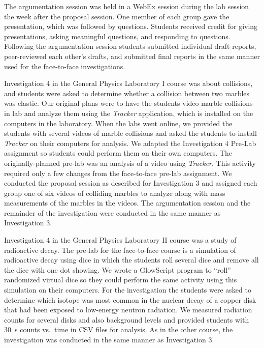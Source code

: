 \documentclass[aip, numerical, preprint]{revtex4-2}
\begin{document}
The argumentation session was held in a WebEx session during the lab session the week
after the proposal session. One member of each group gave the presentation, which was followed
by questions. Students received credit for giving presentations, asking meaningful questions,
and responding to questions.  Following the argumentation session students submitted individual
draft reports, peer-reviewed each other's drafts, and submitted final reports in the same
manner used for the face-to-face investigations.

Investigation 4 in the General Physics Laboratory I course was about collisions, and students
were asked to determine whether a collision between two marbles was elastic. Our original plans
were to have the students video marble collisions in lab and analyze them using the
\emph{Tracker} application\citep{bro2009}, which is installed on the computers in the
laboratory. When the labs went online, we provided the students with several videos of marble
collisions and asked the students to install \emph{Tracker} on their computers for analysis.
We adapted the Investigation 4 Pre-Lab assignment so students could perform them on their own
computers. The originally-planned pre-lab was an analysis of a video using \emph{Tracker}. This
activity required only a few changes from the face-to-face pre-lab assignment. We conducted the
proposal session as described for Investigation 3 and assigned each group one of six videos of
colliding marbles to analyze along with mass measurements of the marbles in the videos. The
argumentation session and the remainder of the investigation were conducted in the same manner
as Investigation 3.

Investigation 4 in the General Physics Laboratory II course was a study of radioactive
decay. The pre-lab for the face-to-face course is a simulation of radioactive decay using dice
in which the students roll several dice and remove all the dice with one dot showing. We wrote
a GlowScript\citep{glowscript} program to ``roll'' randomized virtual dice so they could
perform the same activity using this simulation on their computers. For the investigation the
students were asked to determine which isotope was most common in the nuclear decay of a copper
disk that had been exposed to low-energy neutron radiation. We measured radiation counts for
several disks and also background levels and provided students with \SI{30}{s} counts vs.\ time
in CSV files for analysis. As in the other course, the investigation was conducted in the same
manner as Investigation 3.
\end{document}
